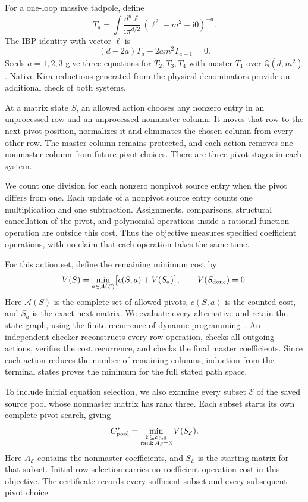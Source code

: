 For a one-loop massive tadpole, define
\[
 T_a=\int\frac{d^d\ell}{\mathrm{i}\pi^{d/2}}\,
       (\ell^2-m^2+\mathrm{i}0)^{-a}.
\]
The IBP identity with vector $\ell$ is
\begin{equation}
 (d-2a)T_a-2am^2T_{a+1}=0.
 \label{eq:general-tadpole-ibp}
\end{equation}
Seeds $a=1,2,3$ give three equations for $T_2,T_3,T_4$ with master
$T_1$ over $\mathbb Q(d,m^2)$.
Native Kira reductions generated from the physical denominators
provide an additional check of both systems.

At a matrix state $S$, an allowed action chooses any nonzero entry
in an unprocessed row and an unprocessed nonmaster column.
It moves that row to the next pivot position, normalizes it and
eliminates the chosen column from every other row.
The master column remains protected, and each action removes one
nonmaster column from future pivot choices.
There are three pivot stages in each system.

We count one division for each nonzero nonpivot source entry when
the pivot differs from one. Each update of a nonpivot source entry
counts one multiplication and one subtraction.
Assignments, comparisons, structural cancellation of the pivot,
and polynomial operations inside a rational-function operation
are outside this cost. Thus the objective measures specified
coefficient operations, with no claim that each operation takes
the same time.

For this action set, define the remaining minimum cost by
\begin{equation}
 V(S)=\min_{a\in\mathcal A(S)}
       \bigl[c(S,a)+V(S_a)\bigr],\qquad V(S_{\rm done})=0.
 \label{eq:general-bellman}
\end{equation}
Here $\mathcal A(S)$ is the complete set of allowed pivots,
$c(S,a)$ is the counted cost, and $S_a$ is the exact next matrix.
We evaluate every alternative and retain the state graph,
using the finite recurrence of dynamic programming~\cite{Bellman1952}.
An independent checker reconstructs every row operation, checks
all outgoing actions, verifies the cost recurrence, and checks
the final master coefficients.
Since each action reduces the number of remaining columns,
induction from the terminal states proves the minimum for
the full stated path space.

To include initial equation selection, we also examine every subset
$\mathcal E$ of the saved source pool whose nonmaster matrix has rank
three. Each subset starts its own complete pivot search, giving
\begin{equation}
 C_{\rm pool}^{*}=
 \min_{\substack{\mathcal E\subseteq\mathcal E_{\rm full}\\
                 \operatorname{rank}A_{\mathcal E}=3}}
 V(S_{\mathcal E}).
 \label{eq:general-pool-optimum}
\end{equation}
Here $A_{\mathcal E}$ contains the nonmaster coefficients, and
$S_{\mathcal E}$ is the starting matrix for that subset.
Initial row selection carries no coefficient-operation cost in
this objective. The certificate records every sufficient subset
and every subsequent pivot choice.

